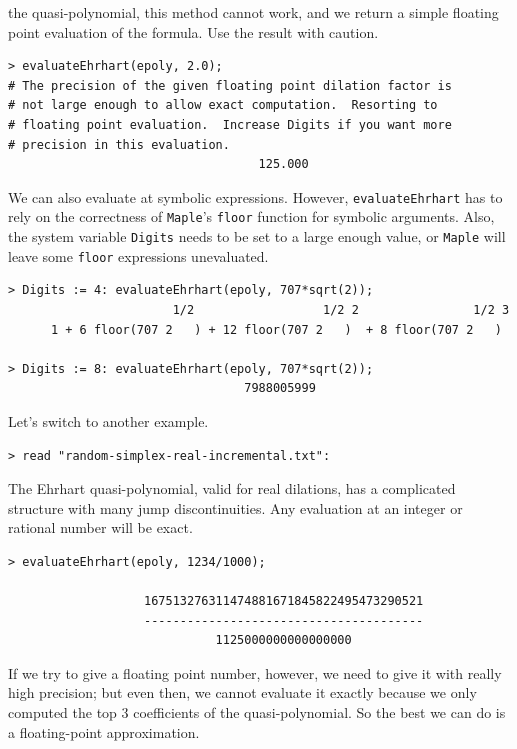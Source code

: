 \documentclass{article}
\newcommand{\maple}{{\tt Maple}\xspace}
\begin{document}
the quasi-polynomial, this method cannot work, and we return a simple floating
point evaluation of the formula.  Use the result with caution.
\begin{verbatim}
> evaluateEhrhart(epoly, 2.0);
# The precision of the given floating point dilation factor is 
# not large enough to allow exact computation.  Resorting to 
# floating point evaluation.  Increase Digits if you want more
# precision in this evaluation.
                                   125.000
\end{verbatim}
We can also evaluate at symbolic expressions.  However,
\texttt{evaluateEhrhart} has to rely on the correctness of \maple's
\texttt{floor} function for symbolic arguments.  Also, the system variable
\texttt{Digits} needs to be set to a large enough value, or \maple will leave
some \texttt{floor} expressions unevaluated.
\begin{verbatim}
> Digits := 4: evaluateEhrhart(epoly, 707*sqrt(2));
                       1/2                  1/2 2                1/2 3
      1 + 6 floor(707 2   ) + 12 floor(707 2   )  + 8 floor(707 2   )

> Digits := 8: evaluateEhrhart(epoly, 707*sqrt(2));
                                 7988005999
\end{verbatim}
Let's switch to another example.  
\begin{verbatim}
> read "random-simplex-real-incremental.txt":
\end{verbatim}
The Ehrhart quasi-polynomial, valid for real
dilations, has a complicated structure with many jump discontinuities.  Any
evaluation at an integer or rational number will be exact.
\begin{verbatim}
> evaluateEhrhart(epoly, 1234/1000);

                   167513276311474881671845822495473290521
                   ---------------------------------------
                             1125000000000000000
\end{verbatim}
If we try to give a floating point number, however, we need to give it with
really high precision; but even then, we cannot evaluate it exactly because we
only computed the top 3 coefficients of the quasi-polynomial.  So the best we
can do is a floating-point approximation.
\end{document}
